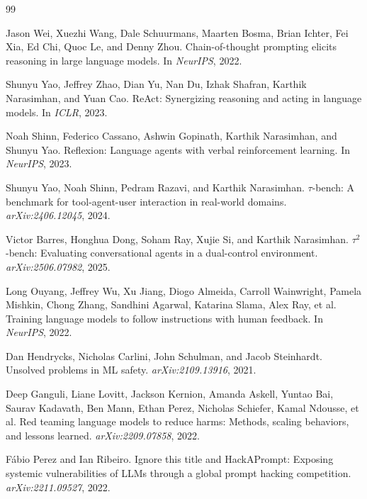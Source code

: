 \documentclass{article}
\begin{document}

\begin{thebibliography}{99}

Jason Wei, Xuezhi Wang, Dale Schuurmans, Maarten Bosma, Brian Ichter, Fei Xia, Ed Chi, Quoc Le, and Denny Zhou.
\newblock Chain-of-thought prompting elicits reasoning in large language models.
\newblock In \emph{NeurIPS}, 2022.

Shunyu Yao, Jeffrey Zhao, Dian Yu, Nan Du, Izhak Shafran, Karthik Narasimhan, and Yuan Cao.
\newblock ReAct: Synergizing reasoning and acting in language models.
\newblock In \emph{ICLR}, 2023.

Noah Shinn, Federico Cassano, Ashwin Gopinath, Karthik Narasimhan, and Shunyu Yao.
\newblock Reflexion: Language agents with verbal reinforcement learning.
\newblock In \emph{NeurIPS}, 2023.

Shunyu Yao, Noah Shinn, Pedram Razavi, and Karthik Narasimhan.
\newblock $\tau$-bench: A benchmark for tool-agent-user interaction in real-world domains.
\newblock \emph{arXiv:2406.12045}, 2024.

Victor Barres, Honghua Dong, Soham Ray, Xujie Si, and Karthik Narasimhan.
\newblock $\tau^2$-bench: Evaluating conversational agents in a dual-control environment.
\newblock \emph{arXiv:2506.07982}, 2025.

Long Ouyang, Jeffrey Wu, Xu Jiang, Diogo Almeida, Carroll Wainwright, Pamela Mishkin, Chong Zhang, Sandhini Agarwal, Katarina Slama, Alex Ray, et al.
\newblock Training language models to follow instructions with human feedback.
\newblock In \emph{NeurIPS}, 2022.

Dan Hendrycks, Nicholas Carlini, John Schulman, and Jacob Steinhardt.
\newblock Unsolved problems in ML safety.
\newblock \emph{arXiv:2109.13916}, 2021.

Deep Ganguli, Liane Lovitt, Jackson Kernion, Amanda Askell, Yuntao Bai, Saurav Kadavath, Ben Mann, Ethan Perez, Nicholas Schiefer, Kamal Ndousse, et al.
\newblock Red teaming language models to reduce harms: Methods, scaling behaviors, and lessons learned.
\newblock \emph{arXiv:2209.07858}, 2022.

Fábio Perez and Ian Ribeiro.
\newblock Ignore this title and HackAPrompt: Exposing systemic vulnerabilities of LLMs through a global prompt hacking competition.
\newblock \emph{arXiv:2211.09527}, 2022.


\end{thebibliography}
\end{document}
